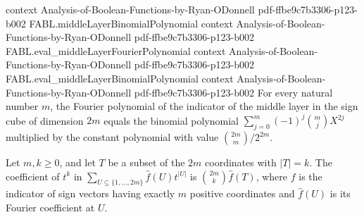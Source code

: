 \begin{theorem}
  {context}
  {Analysis-of-Boolean-Functions-by-Ryan-ODonnell}
  {pdf-ffbe9c7b3306-p123-b002}
\proofstep
  {FABL.middleLayerBinomialPolynomial}
  {context}
  {Analysis-of-Boolean-Functions-by-Ryan-ODonnell}
  {pdf-ffbe9c7b3306-p123-b002}
\proofstep
  {FABL.eval_middleLayerFourierPolynomial}
  {context}
  {Analysis-of-Boolean-Functions-by-Ryan-ODonnell}
  {pdf-ffbe9c7b3306-p123-b002}
\proofstep
  {FABL.eval_middleLayerBinomialPolynomial}
  {context}
  {Analysis-of-Boolean-Functions-by-Ryan-ODonnell}
  {pdf-ffbe9c7b3306-p123-b002}
For every natural number $m$, the Fourier polynomial of the indicator of the middle
layer in the sign cube of dimension $2m$ equals the binomial polynomial
$\sum_{j=0}^{m}(-1)^j\binom{m}{j}X^{2j}$ multiplied by the constant polynomial with
value $\binom{2m}{m}/2^{2m}$.
\end{theorem}

\begin{theorem}
\label{FABL.coeff_middleLayerFourierPolynomial}
\leanok
{}
Let $m,k\ge 0$, and let $T$ be a subset of the $2m$ coordinates with $|T|=k$. The
coefficient of $t^k$ in $\sum_{U\subseteq\{1,\ldots,2m\}}\widehat{f}(U)t^{|U|}$ is
$\binom{2m}{k}\widehat{f}(T)$, where $f$ is the indicator of sign vectors having exactly
$m$ positive coordinates and $\widehat{f}(U)$ is its Fourier coefficient at $U$.
\end{theorem}

